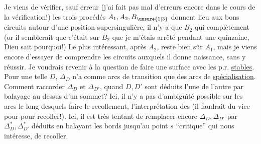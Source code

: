 Je viens de vérifier, sauf erreur (j'ai fait pas mal d'erreurs encore dans le cours de la vérification!) les trois procédés $A_1,A_2,B_{\unsure{1|3}}$ donnent lieu aux bons circuits autour d'une position supersingulière, il n'y a que $B_2$ qui  complètement (or il semblerait que c'était sur $B_2$ que je m'étais arrêté pendant une quinzaine, Dieu sait pourquoi!)
Le plus intéressant, après $A_2$, reste bien sûr $A_1$, mais je viens encore d'essayer de comprendre les circuits auxquels il donne naissance, sans y réussir.
Je voudrais revenir à la question de faire une surface avec les p.r. \uline{stables}. Pour une telle $D$, $\Delta_D$ n'a comme arcs de transition que des arcs de \uline{spécialisation}. Comment raccorder $\Delta_D$ et $\Delta_{D'}$, quand $D,D'$ sont déduits l'une de l'autre par balayage au dessus d'un sommet?
Ici, il n'y a pas d'ambiguïté possible sur les arcs le long desquels faire le recollement,   l'interprétation des  (il faudrait du vice pour  pour recoller!). Ici, il est très tentant de remplacer encore $\Delta_D,\Delta_{D'}$ par $\Delta_D^*,\Delta_{D'}^*$ déduits en balayant les bords jusqu'au point $s$ ``critique'' qui nous intéresse,  de recoller.
